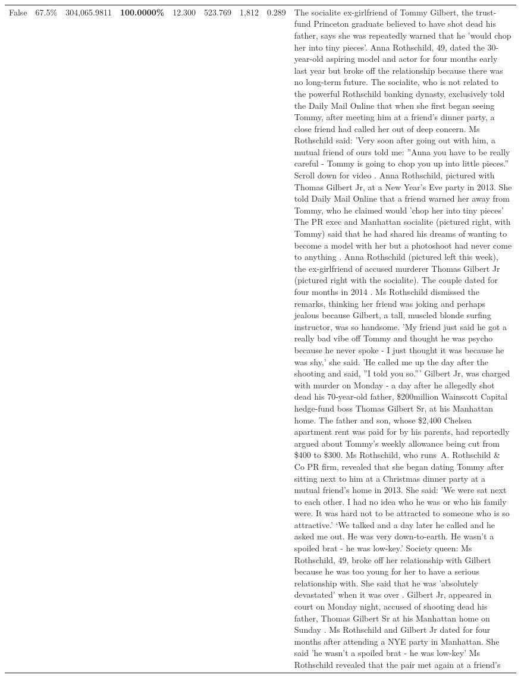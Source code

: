 \begin{table}[H]
\begin{tabular}{lllrlllll}
False & 67.5\% & \color{red} 304,065.9811 & \bfseries \color{red} 100.0000\% & 12.300 & 523.769 & 1,812 & 0.289 & The socialite ex-girlfriend of Tommy Gilbert, the trust-fund Princeton graduate believed to have shot dead his father, says she was repeatedly warned that he 'would chop her into tiny pieces'. Anna Rothschild, 49, dated the 30-year-old aspiring model and actor for four months early last year but broke off the relationship because there was no long-term future. The socialite, who is not related to the powerful Rothschild banking dynasty, exclusively told the Daily Mail Online that when she first began seeing Tommy, after meeting him at a friend's dinner party, a close friend had called her out of deep concern. Ms Rothschild said: 'Very soon after going out with him, a mutual friend of ours told me: ''Anna you have to be really careful - Tommy is going to chop you up into little pieces.'' Scroll down for video . Anna Rothschild, pictured with Thomas Gilbert Jr, at a New Year's Eve party in 2013. She told Daily Mail Online that a friend warned her away from Tommy, who he claimed would 'chop her into tiny pieces' The PR exec and Manhattan socialite (pictured right, with Tommy) said that he had shared his dreams of wanting to become a model with her but a photoshoot had never come to anything . Anna Rothschild (pictured left this week), the ex-girlfriend of accused murderer Thomas Gilbert Jr (pictured right with the socialite). The couple dated for four months in 2014 . Ms Rothschild dismissed the remarks, thinking her friend was joking and perhaps jealous because Gilbert, a tall, muscled blonde surfing instructor, was so handsome. 'My friend just said he got a really bad vibe off Tommy and thought he was psycho because he never spoke - I just thought it was because he was shy,' she said. 'He called me up the day after the shooting and said, ''I told you so.''' Gilbert Jr, was charged with murder on Monday - a day after he allegedly shot dead his 70-year-old father, \$200million Wainscott Capital hedge-fund boss Thomas Gilbert Sr, at his Manhattan home. The father and son, whose \$2,400 Chelsea apartment rent was paid for by his parents, had reportedly argued about Tommy's weekly allowance being cut from \$400 to \$300. Ms Rothschild, who runs A. Rothschild \& Co PR firm, revealed that she began dating Tommy after sitting next to him at a Christmas dinner party at a mutual friend's home in 2013. She said: 'We were sat next to each other. I had no idea who he was or who his family were. It was hard not to be attracted to someone who is so attractive.' ‘We talked and a day later he called and he asked me out. He was very down-to-earth. He wasn’t a spoiled brat - he was low-key.’ Society queen: Ms Rothschild, 49, broke off her relationship with Gilbert because he was too young for her to have a serious relationship with. She said that he was 'absolutely devastated' when it was over . Gilbert Jr, appeared in court on Monday night, accused of shooting dead his father, Thomas Gilbert Sr at his Manhattan home on Sunday . Ms Rothschild and Gilbert Jr dated for four months after attending a NYE party in Manhattan. She said 'he wasn't a spoiled brat - he was low-key' Ms Rothschild revealed that the pair met again at a friend’s 
\end{tabular}
\end{table}
